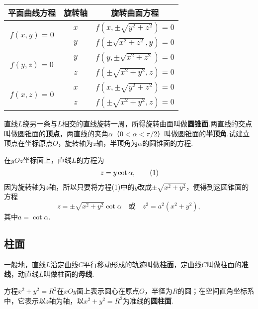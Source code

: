 \begin{center}
\begin{tabular}{c|c|c}
\hline
平面曲线方程 & 旋转轴 & 旋转曲面方程 \\ \hline
\multirow{2}{*}{\(f(x,y)=0\)} & \(x\) & \(f(x,\pm\sqrt{y^2+z^2})=0\) \\ \cline{2-3}
 & \(y\) & \(f(\pm\sqrt{x^2+z^2},y)=0\) \\ \hline
\multirow{2}{*}{\(f(y,z)=0\)} & \(y\) & \(f(y,\pm\sqrt{x^2+z^2})=0\) \\ \cline{2-3}
 & \(z\) & \(f(\pm\sqrt{x^2+y^2},z)=0\) \\ \hline
\multirow{2}{*}{\(f(x,z)=0\)} & \(x\) & \(f(x,\pm\sqrt{y^2+z^2})=0\) \\ \cline{2-3}
 & \(z\) & \(f(\pm\sqrt{x^2+y^2},z)=0\) \\
\hline
\end{tabular}
\end{center}

\begin{example}
直线\(L\)绕另一条与\(L\)相交的直线旋转一周，所得旋转曲面叫做\textbf{圆锥面}.两直线的交点叫做圆锥面的\textbf{顶点}，两直线的夹角\(\alpha\)（\(0<\alpha<\pi/2\)）叫做圆锥面的\textbf{半顶角}.试建立顶点在坐标原点\(O\)，旋转轴为\(z\)轴，半顶角为\(\alpha\)的圆锥面的方程.
\begin{solution}
在\(yOz\)坐标面上，直线\(L\)的方程为\begin{gather}
z = y \cot\alpha, \tag1
\end{gather}因为旋转轴为\(z\)轴，所以只要将方程(1)中的\(y\)改成\(\pm\sqrt{x^2+y^2}\)，便得到这圆锥面的方程\[
z = \pm\sqrt{x^2+y^2} \cot\alpha
\quad \text{或} \quad
z^2 = a^2(x^2+y^2),
\]其中\(a=\cot\alpha\).
\end{solution}
\end{example}

\subsection{柱面}
\begin{definition}
一般地，直线\(L\)沿定曲线\(C\)平行移动形成的轨迹叫做\textbf{柱面}，定曲线\(C\)叫做柱面的\textbf{准线}，动直线\(L\)叫做柱面的\textbf{母线}.
\end{definition}

\begin{example}
方程\(x^2+y^2=R^2\)在\(xOy\)面上表示圆心在原点\(O\)，半径为\(R\)的圆；在空间直角坐标系中，它表示以\(z\)轴为轴，以\(x^2+y^2=R^2\)为准线的\textbf{圆柱面}.
\end{example}

